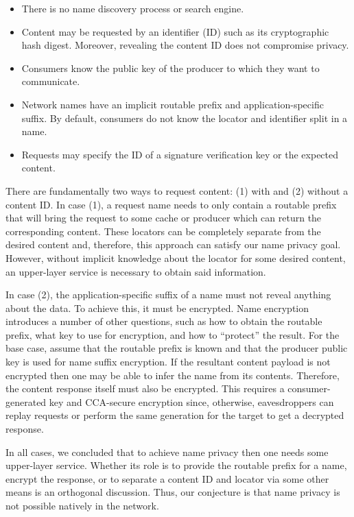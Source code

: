 \documentclass[a4paper,UKenglish]{dagrep}
\begin{document}
\begin{itemize}
\item There is no name discovery process or search engine. 
\item Content may be requested by an identifier (ID) such as its cryptographic hash digest. Moreover, revealing the content ID does not compromise privacy. 
\item Consumers know the public key of the producer to which they want to communicate.
\item Network names have an implicit routable prefix and application-specific suffix. By default, consumers do not know the locator and identifier split in a name.
\item Requests may specify the ID of a signature verification key or the expected content.
\end{itemize}

There are fundamentally two ways to request content: (1) with and (2) without a content ID. In case (1), a request name needs to only contain a routable prefix that will bring the request to some cache or producer which can return the corresponding content. These locators can be completely separate from the desired content and, therefore, this approach can satisfy our name privacy goal. However, without implicit knowledge about the locator for some desired content, an upper-layer service is necessary to obtain said information.

In case (2), the application-specific suffix of a name must not reveal anything about the data. To achieve this, it must be encrypted. Name encryption introduces a number of other questions, such as how to obtain the routable prefix, what key to use for encryption, and how to ``protect'' the result. For the base case, assume that the routable prefix is known and that the producer public key is used for name suffix encryption. If the resultant content payload is not encrypted then one may be able to infer the name from its contents. Therefore, the content response itself must also be encrypted. This requires a consumer-generated key and CCA-secure encryption since, otherwise, eavesdroppers can replay requests or perform the same generation for the target to get a decrypted response.

In all cases, we concluded that to achieve name privacy then one needs some upper-layer service. Whether its role is to provide the routable prefix for a name, encrypt the response, or to separate a content ID and locator via some other means is an orthogonal discussion. Thus, our conjecture is that name privacy is not possible natively in the network.
\end{document}
